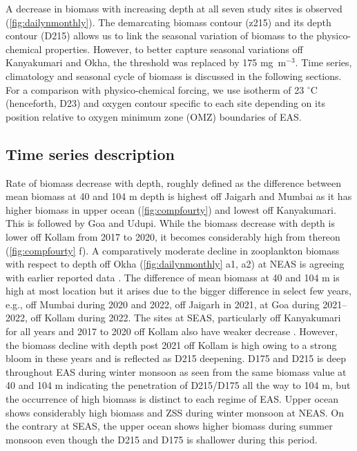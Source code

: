 \documentclass{article}
\begin{document}
	A decrease in biomass with increasing depth at all seven study sites is observed (\cref{fig:dailynmonthly}). The demarcating biomass contour (z215) and its depth contour (D215) allows us to link the seasonal variation of biomass to the physico-chemical properties. However, to better capture seasonal variations off Kanyakumari and Okha, the threshold was replaced by 175 mg~m$^{-3}$. Time series, climatology and seasonal cycle of biomass is discussed in the following sections. For a comparison with physico-chemical forcing, we use isotherm of 23 $^{\circ}$C (henceforth, D23) and oxygen contour specific to each site depending on its position relative to oxygen minimum zone (OMZ) boundaries of EAS. 
	
	
	\subsection{Time series description}
	\label{sec:timeseries}
	Rate of biomass decrease with depth, roughly defined as the difference between mean biomass at 40  and 104 m depth is highest off Jaigarh and Mumbai as it has higher biomass in upper ocean (\cref{fig:compfourty}) and lowest off Kanyakumari. This is followed by Goa and Udupi. While the biomass decrease with depth is lower off Kollam from 2017 to 2020, it becomes considerably high from thereon (\cref{fig:compfourty} f). A comparatively moderate decline in zooplankton biomass with respect to depth off Okha (\cref{fig:dailynmonthly} a1, a2) at NEAS is agreeing with earlier reported data \citep{wishner1998mesozooplankton, madhupratap2001mesozooplankton, smith2005mesozooplankton,jyothibabu2010re}. The difference of mean biomass at 40 and 104 m is high at most location but it arises due to the bigger difference in select few years, e.g., off Mumbai during 2020 and 2022, off Jaigarh in 2021, at Goa during 2021--2022, off Kollam during 2022. The sites at SEAS, particularly off Kanyakumari for all years and 2017 to 2020 off Kollam also have weaker decrease \citep{madhupratap2001mesozooplankton, jyothibabu2010re, aparna2022seasonal}. However, the biomass decline with depth post 2021 off Kollam is high owing to a strong bloom in these years and is reflected as D215 deepening. D175 and D215 is deep throughout EAS during winter monsoon as seen from the same biomass value at 40 and 104 m indicating the penetration of D215/D175 all the way to 104 m, but the occurrence of high biomass is distinct to each regime of EAS. Upper ocean shows considerably high biomass and ZSS during winter monsoon at NEAS. On the contrary at SEAS, the upper ocean shows higher biomass during summer monsoon even though the D215 and D175 is shallower during this period. 
		
\end{document}
